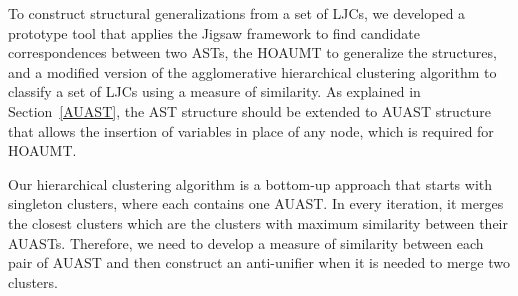 
To construct structural generalizations from a set of LJCs, we developed a prototype tool that applies the Jigsaw framework to find candidate correspondences between two ASTs, the HOAUMT to generalize the structures, and a modified version of the agglomerative hierarchical clustering algorithm to classify a set of LJCs using a measure of similarity. As explained in Section~\ref{AUAST}, the AST structure should be extended to AUAST structure that allows the insertion of variables in place of any node, which is required for HOAUMT.


Our hierarchical clustering algorithm is a bottom-up approach that starts with singleton clusters, where each contains one AUAST. In every iteration, it merges the closest clusters which are the clusters with maximum similarity between their AUASTs. Therefore, we need to develop a measure of similarity between each pair of AUAST and then construct an anti-unifier when it is needed to merge two clusters.


